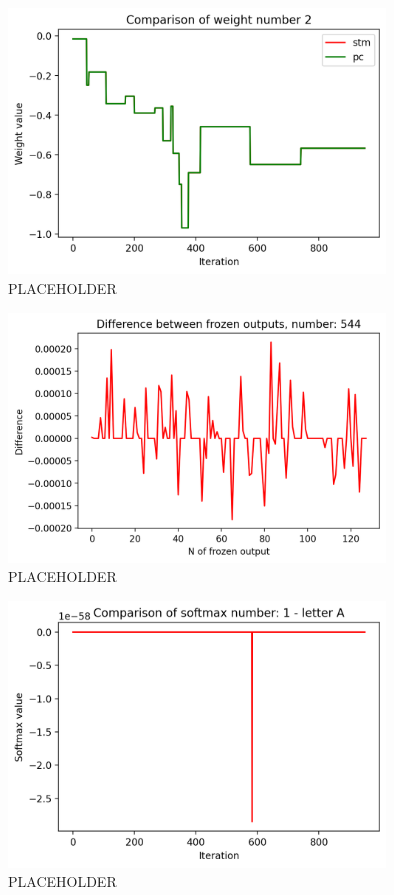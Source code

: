 \documentclass[12pt]{report}
\begin{document}
\begin{figure}[h!]
    \centering
    \includegraphics[width=100mm]{Figures/Chapter5/weight_example.png} 
    \caption{PLACEHOLDER}
    \label{fig:comparison_weights}    
\end{figure}
%
%
\begin{figure}[h!]
    \centering
    \includegraphics[width=100mm]{Figures/Chapter5/frozen_example.png} 
    \caption{PLACEHOLDER}
    \label{fig:comparison_frozen}    
\end{figure}
%
%
\begin{figure}[h!]
    \centering
    \includegraphics[width=100mm]{Figures/Chapter5/softmax_example.png} 
    \caption{PLACEHOLDER}
    \label{fig:comparison_softmax}    
\end{figure}
\end{document}
